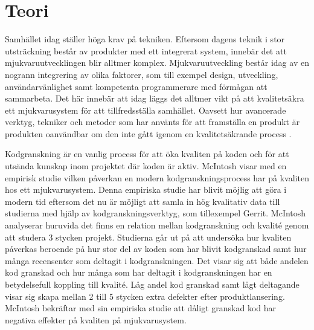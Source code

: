 \section{Teori}
\label{sec:theory-wallstrom}

Samhället idag ställer höga krav på tekniken. Eftersom dagens teknik i stor utsträckning består av produkter med ett integrerat system, innebär det att mjukvaruutvecklingen blir alltmer komplex. Mjukvaruutveckling består idag av en nogrann integrering av olika faktorer, som till exempel design, utveckling, användarvänlighet samt kompetenta programmerare med förmågan att sammarbeta. Det här innebär att idag läggs det alltmer vikt på att kvalitetsäkra ett mjukvarusystem för att tillfredsställa samhället. Oavsett hur avancerade verktyg, tekniker och metoder som har använts för att framställa en produkt är produkten oanvändbar om den inte gått igenom en kvalitetsäkrande process \cite{gill2005factors}.

Kodgranskning är en vanlig process för att öka kvaliten på koden och för att utsända kunskap inom projektet där koden är aktiv. McIntosh \cite{mcintosh2014impact} visar med en empirisk studie vilken påverkan en modern kodgranskningsprocess har på kvaliten hos ett mjukvarusystem. Denna empiriska studie har blivit möjlig att göra i modern tid eftersom det nu är möjligt att samla in hög kvalitativ data till studierna med hjälp av kodgranskningsverktyg, som tillexempel Gerrit. McIntosh analyserar huruvida det finns en relation mellan kodgranskning och kvalité genom att studera 3 stycken projekt. Studierna går ut på att undersöka hur kvaliten påverkas beroende på hur stor del av koden som har blivit kodgranskad samt hur många recensenter som deltagit i kodgranskningen. Det visar sig att både andelen kod granskad och hur många som har deltagit i kodgranskningen har en betydelsefull koppling till kvalité. Låg andel kod granskad samt lågt deltagande visar sig skapa mellan 2 till 5 stycken extra defekter efter produktlansering. McIntosh bekräftar med sin empiriska studie att dåligt granskad kod har negativa effekter på kvaliten på mjukvarusystem.

